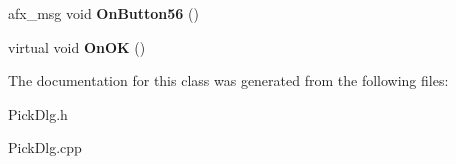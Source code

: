 \begin{DoxyCompactItemize}
\item 
\hypertarget{class_c_pick_dlg_a052021113925614eebf50871f5d3eea5}{afx\-\_\-msg void {\bfseries On\-Button56} ()}\label{class_c_pick_dlg_a052021113925614eebf50871f5d3eea5}

\item 
\hypertarget{class_c_pick_dlg_ac649116bd6a25e16435c1d3be68397ab}{virtual void {\bfseries On\-O\-K} ()}\label{class_c_pick_dlg_ac649116bd6a25e16435c1d3be68397ab}

\end{DoxyCompactItemize}


The documentation for this class was generated from the following files\-:\begin{DoxyCompactItemize}
\item 
Pick\-Dlg.\-h\item 
Pick\-Dlg.\-cpp\end{DoxyCompactItemize}
